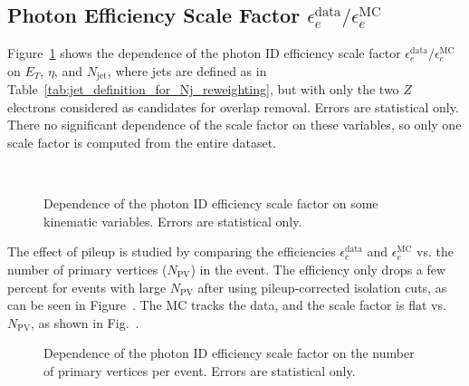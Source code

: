 \documentclass[dissertation.tex]{subfiles}
\begin{document}
\subsection{Photon Efficiency Scale Factor $\epsilon_{e}^{\mathrm{data}}/\epsilon_{e}^{\mathrm{MC}}$}
\label{sec:Photon_Efficiency_Scale_Factor}

Figure~\ref{fig:scale_factors} shows the dependence of the photon ID efficiency scale factor $\epsilon_{e}^{\mathrm{data}}/\epsilon_{e}^{\mathrm{MC}}$ on $E_{T}$, $\eta$, and $N_{\mathrm{jet}}$, where jets are defined as in Table~\ref{tab:jet_definition_for_Nj_reweighting}, but with only the two $Z$ electrons considered as candidates for overlap removal.  Errors are statistical only.  There no significant dependence of the scale factor on these variables, so only one scale factor is computed from the entire dataset.

\begin{figure}
	\centering
	\hspace{1cm}
	\\
	\caption{Dependence of the photon ID efficiency scale factor on some kinematic variables.  Errors are statistical only.}
	\label{fig:scale_factors}
\end{figure}

The effect of pileup is studied by comparing the efficiencies $\epsilon_{e}^{\mathrm{data}}$ and $\epsilon_{e}^{\mathrm{MC}}$ vs. the number of primary vertices ($N_{\mathrm{PV}}$) in the event.  The efficiency only drops a few percent for events with large $N_{\mathrm{PV}}$ after using pileup-corrected isolation cuts, as can be seen in Figure~.  The MC tracks the data, and the scale factor is flat vs. $N_{\mathrm{PV}}$, as shown in Fig.~.

\begin{figure}
	\centering
	\hspace{1cm}
	\caption{Dependence of the photon ID efficiency scale factor on the number of primary vertices per event.  Errors are statistical only.}
	\label{fig:vs_NPV}
\end{figure}
\end{document}
